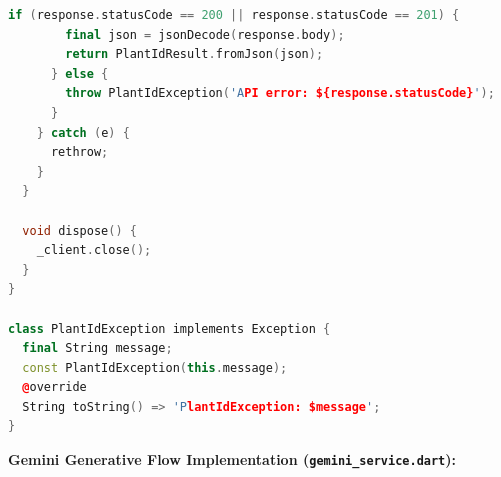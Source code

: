 \documentclass[12pt, a4paper]{report}
\begin{document}
\begin{lstlisting}[language=C++]
      if (response.statusCode == 200 || response.statusCode == 201) {
        final json = jsonDecode(response.body);
        return PlantIdResult.fromJson(json);
      } else {
        throw PlantIdException('API error: ${response.statusCode}');
      }
    } catch (e) {
      rethrow;
    }
  }

  void dispose() {
    _client.close();
  }
}

class PlantIdException implements Exception {
  final String message;
  const PlantIdException(this.message);
  @override
  String toString() => 'PlantIdException: $message';
}
\end{lstlisting}

\vspace{1cm}

\textbf{Gemini Generative Flow Implementation (\texttt{gemini\_service.dart}):}
\end{document}
